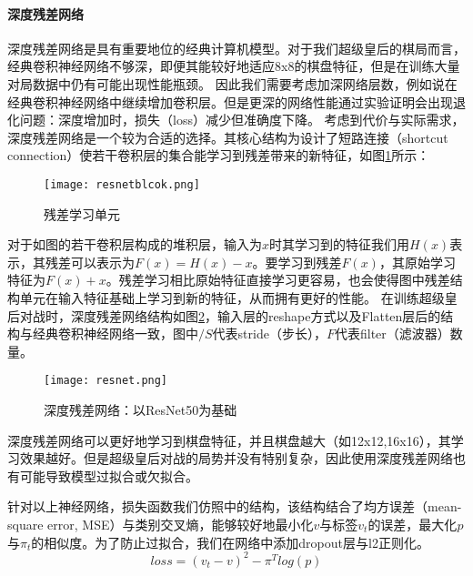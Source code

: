 \paragraph{深度残差网络}
深度残差网络是具有重要地位的经典计算机模型\cite{resnet}。对于我们超级皇后的棋局而言，经典卷积神经网络不够深，即便其能较好地适应8x8的棋盘特征，但是在训练大量对局数据中仍有可能出现性能瓶颈。
因此我们需要考虑加深网络层数，例如说在经典卷积神经网络中继续增加卷积层。但是更深的网络性能通过实验证明会出现退化问题：深度增加时，损失（loss）减少但准确度下降\cite{resnet,he2016identity}。
考虑到代价与实际需求，深度残差网络是一个较为合适的选择\cite{resnet}。其核心结构为设计了短路连接（shortcut connection）使若干卷积层的集合能学习到残差带来的新特征，如图\ref{fig:resunit}所示：
\begin{figure}[H]
    \centering
    \texttt{[image: resnetblcok.png]}
    \caption[resunit]{%
    残差学习单元\cite{resnet}%
      }
    \label{fig:resunit}
\end{figure}
对于如图的若干卷积层构成的堆积层，输入为$x$时其学习到的特征我们用$H(x)$表示，其残差可以表示为$F(x)=H(x)-x$。要学习到残差$F(x)$，其原始学习特征为$F(x)+x$。残差学习相比原始特征直接学习更容易，也会使得图中残差结构单元在输入特征基础上学习到新的特征，从而拥有更好的性能。
在训练超级皇后对战时，深度残差网络结构如图\ref{fig:res}，输入层的reshape方式以及Flatten层后的结构与经典卷积神经网络一致，图中$/S$代表stride（步长），$F$代表filter（滤波器）数量。
\begin{figure}[H]
    \centering
    \texttt{[image: resnet.png]}
    \caption[res]{%
    深度残差网络：以ResNet50为基础\cite{resnet}%
      }
    \label{fig:res}
\end{figure}
深度残差网络可以更好地学习到棋盘特征，并且棋盘越大（如12x12,16x16），其学习效果越好。但是超级皇后对战的局势并没有特别复杂，因此使用深度残差网络也有可能导致模型过拟合或欠拟合。

针对以上神经网络，损失函数我们仿照\cite{Silver2017}中的结构，该结构结合了均方误差（mean-square error, MSE）与类别交叉熵，能够较好地最小化$v$与标签$v_{t}$的误差，最大化$p$与$\pi_{t}$的相似度。为了防止过拟合，我们在网络中添加dropout层与l2正则化。
\begin{equation}
    loss = (v_{t}-v)^{2} - \pi^{T}log(p)
\end{equation}

